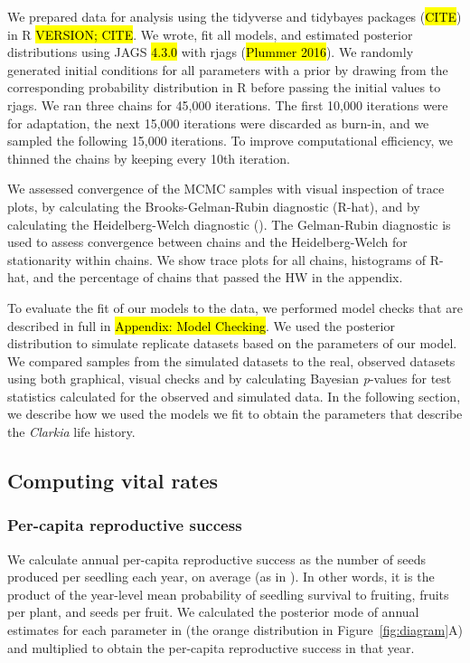 \documentclass[12pt, oneside, titlepage]{article}   	%
\begin{document}
We prepared data for analysis using the tidyverse and tidybayes packages (\hl{CITE}) in R \hl{VERSION; CITE}. We wrote, fit all models, and estimated posterior distributions using JAGS \hl{4.3.0} with rjags (\hl{Plummer 2016}). We randomly generated initial conditions for all parameters with a prior by drawing from the corresponding probability distribution in R before passing the initial values to rjags. We ran three chains for 45,000 iterations. The first 10,000 iterations were for adaptation, the next 15,000 iterations were discarded as burn-in, and we sampled the following 15,000 iterations. To improve computational efficiency, we thinned the chains by keeping every 10th iteration.

We assessed convergence of the MCMC samples with visual inspection of trace plots, by calculating the Brooks-Gelman-Rubin diagnostic (R-hat), and by calculating the Heidelberg-Welch diagnostic (\cite{elderd2015}). The Gelman-Rubin diagnostic is used to assess convergence between chains and the Heidelberg-Welch for stationarity within chains. We show trace plots for all chains, histograms of R-hat, and the percentage of chains that passed the HW in the appendix. 
 
To evaluate the fit of our models to the data, we performed model checks that are described in full in \hl{Appendix: Model Checking}. We used the posterior distribution to simulate replicate datasets based on the parameters of our model. We compared samples from the simulated datasets to the real, observed datasets using both graphical, visual checks and by calculating Bayesian \textit{p}-values for test statistics calculated for the observed and simulated data. In the following section, we describe how we used the models we fit to obtain the parameters that describe the \textit{Clarkia} life history.

\subsection{Computing vital rates}

\subsubsection{Per-capita reproductive success}

We calculate annual per-capita reproductive success as the number of seeds produced per seedling each year, on average (as in \cite{venable2007,gremer2014}). In other words, it is the product of the year-level mean probability of seedling survival to fruiting, fruits per plant, and seeds per fruit. We calculated the posterior mode of annual estimates for each parameter in (the orange distribution in Figure~\ref{fig:diagram}A) and multiplied to obtain the per-capita reproductive success in that year. 
\end{document}
